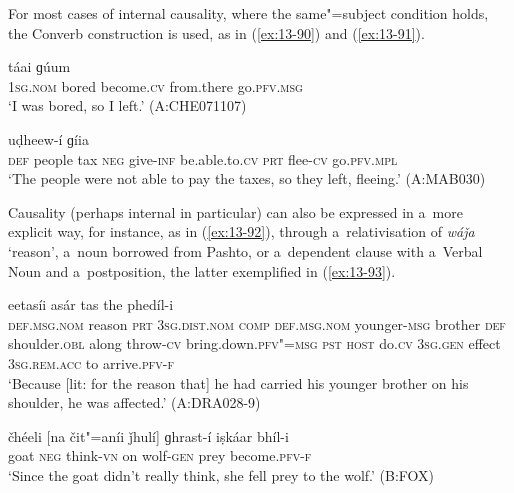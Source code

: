 For most cases of internal causality, where the same"=subject condition holds, the Converb construction is used, as in (\ref{ex:13-90}) and (\ref{ex:13-91}).

\begin{exe}
\ex
\label{ex:13-90}
 táai ɡúum  \\
\textsc{1sg.nom} bored become.\textsc{cv} from.there go.\textsc{pfv.msg}  \\
\glt `I was bored, so I left.' (A:CHE071107)

\ex
\label{ex:13-91}
 uḍheew-í ɡíia \\
 \textsc{def} people tax \textsc{neg} give-\textsc{inf} be.able.to.\textsc{cv} \textsc{prt}  flee-\textsc{cv}  go.\textsc{pfv.mpl}   \\
\glt `The people were not able to pay the taxes, so they left, fleeing.' (A:MAB030) 
\end{exe}

Causality (perhaps internal in particular) can also be expressed in a~more explicit way, for instance, as in (\ref{ex:13-92}), through a~relativisation of \textit{wáǰa} `reason', a~noun borrowed from Pashto, or a~dependent clause with a~Verbal Noun and a~postposition, the latter exemplified in (\ref{ex:13-93}).

\begin{exe}
\ex
\label{ex:13-92}
 eetasíi asár tas the phedíl-i \\
\textsc{def.msg.nom} reason \textsc{prt} \textsc{3sg.dist.nom} \textsc{comp} \textsc{def.msg.nom} younger-\textsc{msg} brother \textsc{def}{\protect\footnotemark} shoulder.\textsc{obl} along throw-\textsc{cv} bring.down.\textsc{pfv"=msg} \textsc{pst} \textsc{host} do.\textsc{cv}  \textsc{3sg.gen} effect \textsc{3sg.rem.acc} to arrive.\textsc{pfv-f} \\
\glt `Because [lit: for the reason that] he had carried his younger brother on his shoulder, he was affected.' (A:DRA028-9)

\ex
\label{ex:13-93}
\gll čhéeli [na čit"=aníi ǰhulí] ɡhrast-í iṣkáar bhíl-i \\
goat \textsc{neg} think-\textsc{vn} on wolf-\textsc{gen} prey become.\textsc{pfv-f}  \\
\glt `Since the goat didn't really think, she fell prey to the wolf.' (B:FOX)
\end{exe}


